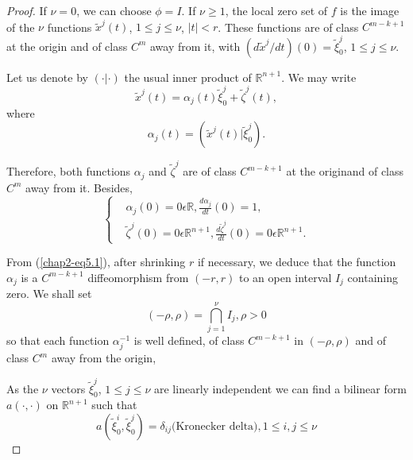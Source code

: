 \begin{proof}
If $\nu = 0$, we can choose $\phi = I$. If $\nu \geq 1$, the local
zero set of $f$ is the image of the $\nu$ functions
$\widetilde{x}^{j}(t)$, $1 \leq j \leq \nu$, $|t| < r$. These
functions are of class $C^{m-k+1}$ at the origin and of class $C^{m}$
away from it, with $(d\widetilde{x}^{j} / dt)(0) =
\widetilde{\xi}_{0}^{j}$, $1 \leq j \leq \nu$.

Let us denote by $(\cdot | \cdot)$ the usual inner product of
$\mathbb{R}^{n+1}$. We may write
$$
\widetilde{x}^{j}(t) = \alpha_{j}(t) \widetilde{\xi}_{0}^{j} +
\widetilde{\zeta}^{j}(t), 
$$
where
$$
\alpha_{j}(t) = (\widetilde{x}^{j}(t) | \widetilde{\xi}_{0}^{j}).
$$

Therefore, both functions $\alpha_{j}$ and $\widetilde{\zeta}^{j}$ are
of class $C^{m-k+1}$ at the origin\pageoriginale and of class $C^{m}$
away from it. Besides,
\begin{equation*}
\begin{cases}
& \alpha_{j}(0) = 0 \epsilon \mathbb{R}, \frac{d\alpha_{j}}{dt} (0) =
  1,\\
& \widetilde{\zeta}^{j} (0) = 0 \epsilon \mathbb{R}^{n+1},
  \frac{d\widetilde{\zeta}^{j}}{dt} (0) = 0 \epsilon
  \mathbb{R}^{n+1}.
\end{cases}\tag{5.1}\label{chap2-eq5.1} 
\end{equation*}

From (\ref{chap2-eq5.1}), after shrinking $r$ if necessary, we deduce
that the function $\alpha_{j}$ is a $C^{m-k+1}$ diffeomorphism from
$(-r, r)$ to an open interval $I_{j}$ containing zero. We shall set
$$
(-\rho, \rho) = \bigcap\limits_{j=1}^{\nu} I_{j}, \rho > 0
$$
so that each function $\alpha_{j}^{-1}$ is well defined, of class
$C^{m-k+1}$ in $(-\rho, \rho)$ and of class $C^{m}$ away from the
origin,

As the $\nu$ vectors $\widetilde{\xi}_{0}^{j}$, $1 \leq j \leq \nu$
are linearly independent we can find a bilinear form $a(\cdot ,
\cdot)$ on $\mathbb{R}^{n+1}$ such that
\begin{equation*}
a(\widetilde{\xi}_{0}^{i}, \widetilde{\xi}_{0}^{j}) = \delta_{ij}
\text{(Kronecker delta)}, 1 \leq i, j \leq \nu\tag{5.2}\label{chap2-eq5.2}
\end{equation*}


\end{proof}

